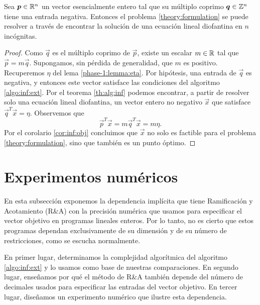 \begin{theorem}
	\label{infinite:th:complexity}
	Sea $\boldsymbol{p} \in \mathbb{R}^n$ un vector esencialmente entero tal que su múltiplo coprimo $\boldsymbol{q} \in
	\mathbb{Z}^n$ tiene una entrada negativa. Entonces el problema \eqref{theory:formulation} se puede
	resolver a través de encontrar la solución de una ecuación lineal diofantina en $n$ incógnitas.
\end{theorem}
\begin{proof}
	Como $\vec{q}$ es el múltiplo coprimo de $\vec{p}$, existe un escalar $m \in \mathbb{R}$ tal que
	$\vec{p} = m\vec{q}$. Supongamos, sin pérdida de generalidad, que $m$ es positivo. Recuperemos
	$\eta$ del lema \ref{phase-1:lemma:eta}. Por hipótesis, una entrada de $\vec{q}$ es negativa, y
	entonces este vector satisface las condiciones del algoritmo \ref{algo:inf:ext}. Por el teorema
	\ref{th:alg:inf} podemos encontrar, a partir de resolver solo una ecuación lineal diofantina, un
	vector entero no negativo $\vec{x}$ que satisface $\vec{q}^T\vec{x} = \eta$. Observemos que
	\begin{equation*}
		\vec{p}^T\vec{x} = m\vec{q}^T\vec{x} = m\eta.
	\end{equation*}
	Por el corolario \ref{cor:inf:obj} concluimos que $\vec{x}$ no solo es factible para el problema
	\eqref{theory:formulation}, sino que también es un punto óptimo.
\end{proof}

\section{Experimentos numéricos}
\label{sec:inf:exp}
\noindent
En esta subsección exponemos la dependencia implícita que tiene Ramificación y Acotamiento (R\&A)
con la precisión numérica que usamos para especificar el vector objetivo en programas lineales
enteros. Por lo tanto, no es cierto que estos programas dependan exclusivamente de su dimensión y de
su número de restricciones, como se escucha normalmente.

En primer lugar, determinamos la complejidad algorítmica del algoritmo \ref{algo:inf:ext} y lo
usamos como base de nuestras comparaciones. En segundo lugar, enseñamos por qué el método de R\&A
también depende del número de decimales usados para especificar las entradas del vector objetivo. En
tercer lugar, diseñamos un experimento numérico que ilustre esta dependencia.

